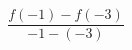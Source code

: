 \documentclass[preview]{standalone}
\begin{document}
\begin{align*}
\dfrac{f(-1) - f(-3)}{-1 - (-3)}
\end{align*}
\end{document}
